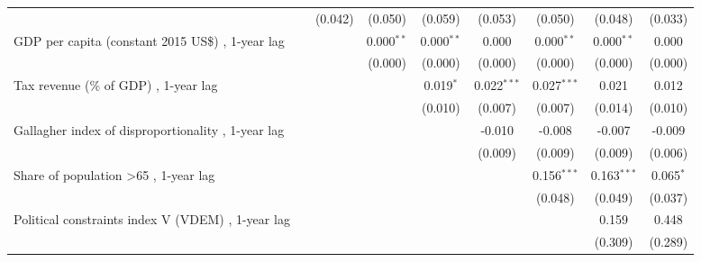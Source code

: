 \begin{table}[htbp]
\begin{tabular}{lcccccccc}
                                                                                 &               & (0.042)       & (0.050)        & (0.059)      & (0.053)       & (0.050)       & (0.048)       & (0.033)\\   
      GDP per capita (constant 2015 US\$) , 1-year lag                           &               &               & 0.000$^{**}$   & 0.000$^{**}$ & 0.000         & 0.000$^{**}$  & 0.000$^{**}$  & 0.000\\   
                                                                                 &               &               & (0.000)        & (0.000)      & (0.000)       & (0.000)       & (0.000)       & (0.000)\\   
      Tax revenue (\% of GDP) , 1-year lag                                       &               &               &                & 0.019$^{*}$  & 0.022$^{***}$ & 0.027$^{***}$ & 0.021         & 0.012\\   
                                                                                 &               &               &                & (0.010)      & (0.007)       & (0.007)       & (0.014)       & (0.010)\\   
      Gallagher index of disproportionality , 1-year lag                         &               &               &                &              & -0.010        & -0.008        & -0.007        & -0.009\\   
                                                                                 &               &               &                &              & (0.009)       & (0.009)       & (0.009)       & (0.006)\\   
      Share of population >65 , 1-year lag                                       &               &               &                &              &               & 0.156$^{***}$ & 0.163$^{***}$ & 0.065$^{*}$\\   
                                                                                 &               &               &                &              &               & (0.048)       & (0.049)       & (0.037)\\   
      Political constraints index V (VDEM) , 1-year lag                          &               &               &                &              &               &               & 0.159         & 0.448\\   
                                                                                 &               &               &                &              &               &               & (0.309)       & (0.289)\\   

\end{tabular}
\end{table}

